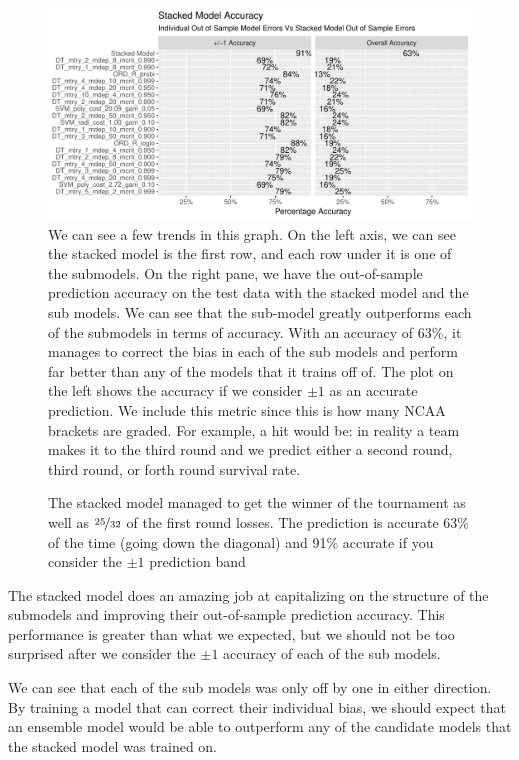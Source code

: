 \documentclass[10pt,a4paper, hidelinks]{article} %
\begin{document}
\begin{figure}[H]
	\centering
	\includegraphics[width=1\linewidth]{../fig/StackedModelAccuracy}
	\caption{We can see a few trends in this graph. On the left axis, we can see the stacked model is the first row, and each row under it is one of the submodels. On the right pane, we have the out-of-sample prediction accuracy on the test data with the stacked model and the sub models. We can see that the sub-model greatly outperforms each of the submodels in terms of accuracy. With an accuracy of 63\%, it manages to correct the bias in each of the sub models and perform far better than any of the models that it trains off of. The plot on the left shows the accuracy if we consider $\pm 1$ as an accurate prediction. We include this metric since this is how many NCAA brackets are graded. For example, a hit would be: in reality a team makes it to the third round and we predict either a second round, third round, or forth round survival rate.}
	\label{fig:stackedmodelaccuracy}
\end{figure}

\begin{figure}[H]
	\centering
	
	\caption{The stacked model managed to get the winner of the tournament as well as $\nicefrac{25}{32}$ of the first round losses. The prediction is accurate 63\% of the time (going down the diagonal) and 91\% accurate if you consider the $\pm 1$ prediction band}
\end{figure}


The stacked model does an amazing job at capitalizing on the structure of the submodels and improving their out-of-sample prediction accuracy. This performance is greater than what we expected, but we should not be too surprised after we consider the $\pm1$ accuracy of each of the sub models. 

We can see that each of the sub models was only off by one in either direction. By training a model that can correct their individual bias, we should expect that an ensemble model would be able to outperform any of the candidate models that the stacked model was trained on. 
\end{document}

